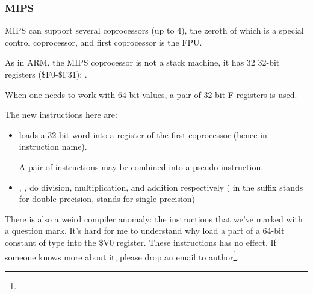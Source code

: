 \subsubsection{MIPS}

MIPS can support several coprocessors (up to 4), 
the zeroth of which is a special control coprocessor,
and first coprocessor is the FPU.

As in ARM, the MIPS coprocessor is not a stack machine, it has 32 32-bit registers (\$F0-\$F31):
.

When one needs to work with 64-bit \Tdouble values, a pair of 32-bit F-registers is used.



The new instructions here are:

\begin{itemize}

\item {} loads a 32-bit word into a register of the first coprocessor (hence  in instruction name).

A pair of  instructions may be combined into a  pseudo instruction.

\item {}, ,  do division, multiplication, and addition respectively 
( in the suffix stands for double precision,  stands for single precision)

\end{itemize}

\myindex{\CompilerAnomaly}
\label{MIPS_FPU_LUI}

There is also a weird compiler anomaly: the  instructions that we've marked with a question mark.
It's hard for me to understand why load a part of a 64-bit constant of \Tdouble type into the \$V0 register.
These instructions has no effect.
If someone knows more about it, please drop an email to author\footnote{\EMAIL}.

